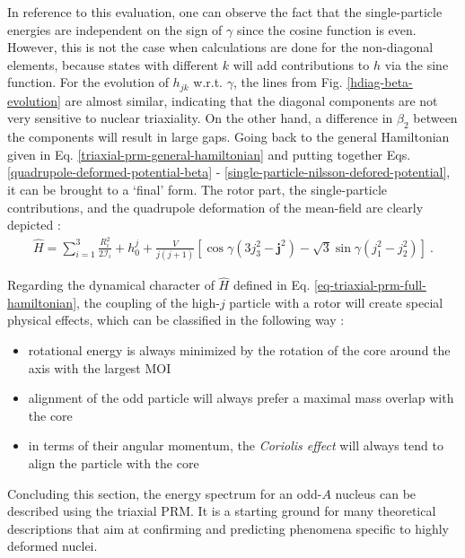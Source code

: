 In reference to this evaluation, one can observe the fact that the single-particle energies are independent on the sign of $\gamma$ since the cosine function is even. However, this is not the case when calculations are done for the non-diagonal elements, because states with different $k$ will add contributions to $h$ via the sine function. For the evolution of $h_{jk}$ w.r.t. $\gamma$, the lines from Fig. \ref{hdiag-beta-evolution} are almost similar, indicating that the diagonal components are not very sensitive to nuclear triaxiality. On the other hand, a difference in $\beta_2$ between the components will result in large gaps. Going back to the general Hamiltonian given in Eq. \eqref{triaxial-prm-general-hamiltonian} and putting together Eqs. \eqref{quadrupole-deformed-potential-beta} - \eqref{single-particle-nilsson-defored-potential}, it can be brought to a `final' form. The rotor part, the single-particle contributions, and the quadrupole deformation of the mean-field are clearly depicted \cite{ring2004nuclear}:
\begin{align}
    \hat{H}=\sum_{i=1}^3\frac{R_i^2}{2\mathcal{I}_i}+h_0^j+\frac{V}{j(j+1)}\left[\cos\gamma(3j_3^2-\mathbf{j}^2)-\sqrt{3}\sin\gamma(j_1^2-j_2^2)\right]\ .
    \label{eq-triaxial-prm-full-hamiltonian}
\end{align}

Regarding the dynamical character of $\hat{H}$ defined in Eq. \eqref{eq-triaxial-prm-full-hamiltonian}, the coupling of the high-$j$ particle with a rotor will create special physical effects, which can be classified in the following way \cite{ring2004nuclear}:
\begin{itemize}
    \item rotational energy is always minimized by the rotation of the core around the axis with the largest MOI
    \item alignment of the odd particle will always prefer a maximal mass overlap with the core %
    \item in terms of their angular momentum, the \emph{Coriolis effect} will always tend to align the particle with the core
\end{itemize}

Concluding this section, the energy spectrum for an odd-$A$ nucleus can be described using the triaxial PRM. It is a starting ground for many theoretical descriptions that aim at confirming and predicting phenomena specific to highly deformed nuclei.

